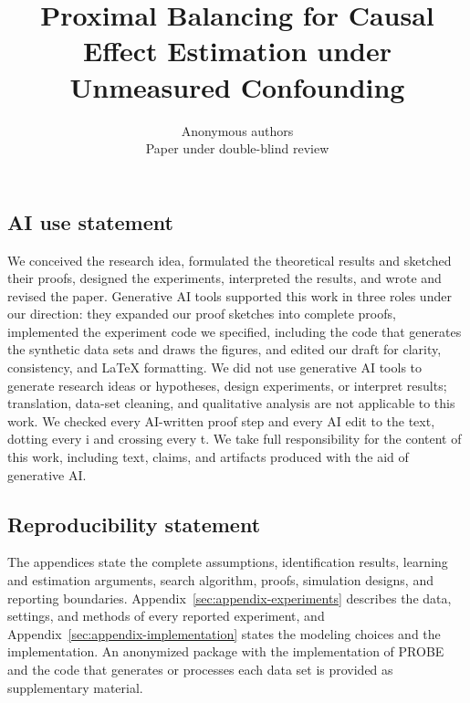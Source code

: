 \documentclass{article}
\title{Proximal Balancing for Causal Effect Estimation under Unmeasured Confounding}
\author{Anonymous authors\\Paper under double-blind review}
\theoremstyle{uprightboxed}
\begin{document}
\maketitle

\begin{abstract}

\end{abstract}







\clearpage
\subsection*{AI use statement}
 We conceived the research idea, formulated the theoretical results and sketched their proofs, designed the experiments, interpreted the results, and wrote and revised the paper. Generative AI tools supported this work in three roles under our direction: they expanded our proof sketches into complete proofs, implemented the experiment code we specified, including the code that generates the synthetic data sets and draws the figures, and edited our draft for clarity, consistency, and LaTeX formatting. We did not use generative AI tools to generate research ideas or hypotheses, design experiments, or interpret results; translation, data-set cleaning, and qualitative analysis are not applicable to this work. We checked every AI-written proof step and every AI edit to the text, dotting every i and crossing every t. We take full responsibility for the content of this work, including text, claims, and artifacts produced with the aid of generative AI.

\subsection*{Reproducibility statement}
The appendices state the complete assumptions, identification results, learning and estimation arguments, search algorithm, proofs, simulation designs, and reporting boundaries. Appendix~\ref{sec:appendix-experiments} describes the data, settings, and methods of every reported experiment, and Appendix~\ref{sec:appendix-implementation} states the modeling choices and the implementation. An anonymized package with the implementation of PROBE and the code that generates or processes each data set is provided as supplementary material.

\clearpage



\appendix





\end{document}
